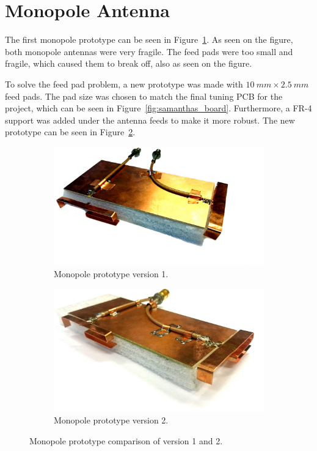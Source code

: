 \section{Monopole Antenna}
The first monopole prototype can be seen in Figure~\ref{fig:ant1_proto1_3d}. As seen on the figure, both monopole antennas were very fragile. The feed pads were too small and fragile, which caused them to break off, also as seen on the figure.

To solve the feed pad problem, a new prototype was made with $\SI{10}{mm}\times \SI{2.5}{mm}$ feed pads. The pad size was chosen to match the final tuning PCB for the project, which can be seen in Figure~\ref{fig:samanthas_board}. Furthermore, a FR-4 support was added under the antenna feeds to make it more robust. The new prototype can be seen in Figure~\ref{fig:ant1_proto2_3d}.

\begin{figure}[htbp]
  \begin{subfigure}[b]{0.49\linewidth}
        \centering
        \includegraphics[scale=0.2]{img/tech_sol/monopole/prototype_v1/monopole_v1}
        \caption{Monopole prototype version 1.}
        \label{fig:ant1_proto1_3d}
    \end{subfigure}
    \hfill
    \begin{subfigure}[b]{0.49\linewidth}
        \centering
        \includegraphics[scale=0.27]{img/tech_sol/monopole/prototype_v2/monopole_v2}
        \caption{Monopole prototype version 2.}
        \label{fig:ant1_proto2_3d}
    \end{subfigure}
    \caption{Monopole prototype comparison of version 1 and 2.}
    \label{fig:ant_1_proto_3d}
\end{figure}

